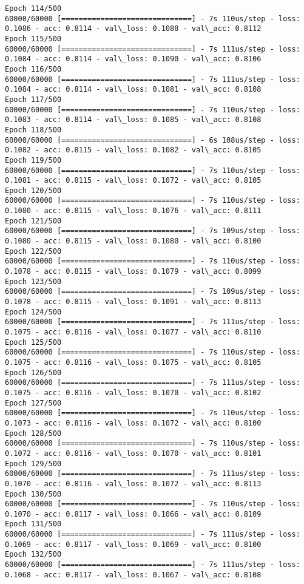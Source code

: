 \documentclass[11pt]{article}
\begin{document}
\begin{Verbatim}[commandchars=\\\{\}]
Epoch 114/500
60000/60000 [==============================] - 7s 110us/step - loss: 0.1086 - acc: 0.8114 - val\_loss: 0.1088 - val\_acc: 0.8112
Epoch 115/500
60000/60000 [==============================] - 7s 111us/step - loss: 0.1084 - acc: 0.8114 - val\_loss: 0.1090 - val\_acc: 0.8106
Epoch 116/500
60000/60000 [==============================] - 7s 111us/step - loss: 0.1084 - acc: 0.8114 - val\_loss: 0.1081 - val\_acc: 0.8108
Epoch 117/500
60000/60000 [==============================] - 7s 110us/step - loss: 0.1083 - acc: 0.8114 - val\_loss: 0.1085 - val\_acc: 0.8108
Epoch 118/500
60000/60000 [==============================] - 6s 108us/step - loss: 0.1082 - acc: 0.8115 - val\_loss: 0.1082 - val\_acc: 0.8105
Epoch 119/500
60000/60000 [==============================] - 7s 110us/step - loss: 0.1081 - acc: 0.8115 - val\_loss: 0.1072 - val\_acc: 0.8105
Epoch 120/500
60000/60000 [==============================] - 7s 110us/step - loss: 0.1080 - acc: 0.8115 - val\_loss: 0.1076 - val\_acc: 0.8111
Epoch 121/500
60000/60000 [==============================] - 7s 109us/step - loss: 0.1080 - acc: 0.8115 - val\_loss: 0.1080 - val\_acc: 0.8100
Epoch 122/500
60000/60000 [==============================] - 7s 110us/step - loss: 0.1078 - acc: 0.8115 - val\_loss: 0.1079 - val\_acc: 0.8099
Epoch 123/500
60000/60000 [==============================] - 7s 109us/step - loss: 0.1078 - acc: 0.8115 - val\_loss: 0.1091 - val\_acc: 0.8113
Epoch 124/500
60000/60000 [==============================] - 7s 111us/step - loss: 0.1075 - acc: 0.8116 - val\_loss: 0.1077 - val\_acc: 0.8110
Epoch 125/500
60000/60000 [==============================] - 7s 110us/step - loss: 0.1075 - acc: 0.8116 - val\_loss: 0.1075 - val\_acc: 0.8105
Epoch 126/500
60000/60000 [==============================] - 7s 111us/step - loss: 0.1075 - acc: 0.8116 - val\_loss: 0.1070 - val\_acc: 0.8102
Epoch 127/500
60000/60000 [==============================] - 7s 110us/step - loss: 0.1073 - acc: 0.8116 - val\_loss: 0.1072 - val\_acc: 0.8100
Epoch 128/500
60000/60000 [==============================] - 7s 110us/step - loss: 0.1072 - acc: 0.8116 - val\_loss: 0.1070 - val\_acc: 0.8101
Epoch 129/500
60000/60000 [==============================] - 7s 111us/step - loss: 0.1070 - acc: 0.8116 - val\_loss: 0.1072 - val\_acc: 0.8113
Epoch 130/500
60000/60000 [==============================] - 7s 110us/step - loss: 0.1070 - acc: 0.8117 - val\_loss: 0.1066 - val\_acc: 0.8109
Epoch 131/500
60000/60000 [==============================] - 7s 111us/step - loss: 0.1069 - acc: 0.8117 - val\_loss: 0.1069 - val\_acc: 0.8100
Epoch 132/500
60000/60000 [==============================] - 7s 111us/step - loss: 0.1068 - acc: 0.8117 - val\_loss: 0.1067 - val\_acc: 0.8108

\end{Verbatim}
\end{document}

